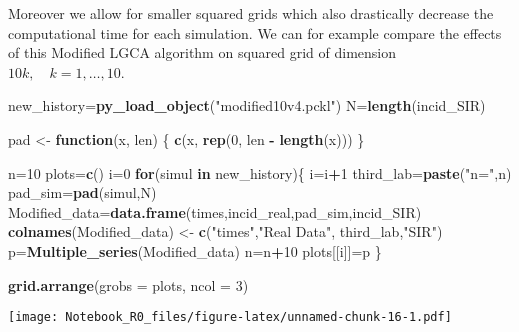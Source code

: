 \documentclass[
]{article}
\newenvironment{Shaded}{\begin{snugshade}}{\end{snugshade}}
\newcommand{\AttributeTok}[1]{\textcolor[rgb]{0.13,0.29,0.53}{#1}}
\newcommand{\ControlFlowTok}[1]{\textcolor[rgb]{0.13,0.29,0.53}{\textbf{#1}}}
\newcommand{\DecValTok}[1]{\textcolor[rgb]{0.00,0.00,0.81}{#1}}
\newcommand{\FunctionTok}[1]{\textcolor[rgb]{0.13,0.29,0.53}{\textbf{#1}}}
\newcommand{\NormalTok}[1]{#1}
\newcommand{\OtherTok}[1]{\textcolor[rgb]{0.56,0.35,0.01}{#1}}
\newcommand{\SpecialCharTok}[1]{\textcolor[rgb]{0.81,0.36,0.00}{\textbf{#1}}}
\newcommand{\StringTok}[1]{\textcolor[rgb]{0.31,0.60,0.02}{#1}}
\begin{document}
Moreover we allow for smaller squared grids which also drastically
decrease the computational time for each simulation. We can for example
compare the effects of this Modified LGCA algorithm on squared grid of
dimension \(10k,\quad k=1,\dots,10\).

\begin{Shaded}
\begin{Highlighting}[]
\NormalTok{new\_history}\OtherTok{=}\FunctionTok{py\_load\_object}\NormalTok{(}\StringTok{"modified10v4.pckl"}\NormalTok{)}
\NormalTok{N}\OtherTok{=}\FunctionTok{length}\NormalTok{(incid\_SIR)}

\NormalTok{pad }\OtherTok{\textless{}{-}} \ControlFlowTok{function}\NormalTok{(x, len) \{}
  \FunctionTok{c}\NormalTok{(x, }\FunctionTok{rep}\NormalTok{(}\DecValTok{0}\NormalTok{, len }\SpecialCharTok{{-}} \FunctionTok{length}\NormalTok{(x)))}
\NormalTok{\}}


\NormalTok{n}\OtherTok{=}\DecValTok{10}
\NormalTok{plots}\OtherTok{=}\FunctionTok{c}\NormalTok{()}
\NormalTok{i}\OtherTok{=}\DecValTok{0}
\ControlFlowTok{for}\NormalTok{(simul }\ControlFlowTok{in}\NormalTok{ new\_history)\{}
\NormalTok{  i}\OtherTok{=}\NormalTok{i}\SpecialCharTok{+}\DecValTok{1}
\NormalTok{  third\_lab}\OtherTok{=}\FunctionTok{paste}\NormalTok{(}\StringTok{"n="}\NormalTok{,n)}
\NormalTok{  pad\_sim}\OtherTok{=}\FunctionTok{pad}\NormalTok{(simul,N)}
\NormalTok{  Modified\_data}\OtherTok{=}\FunctionTok{data.frame}\NormalTok{(times,incid\_real,pad\_sim,incid\_SIR)}
  \FunctionTok{colnames}\NormalTok{(Modified\_data) }\OtherTok{\textless{}{-}} \FunctionTok{c}\NormalTok{(}\StringTok{"times"}\NormalTok{,}\StringTok{"Real Data"}\NormalTok{,  third\_lab,}\StringTok{"SIR"}\NormalTok{)}
\NormalTok{  p}\OtherTok{=}\FunctionTok{Multiple\_series}\NormalTok{(Modified\_data)}
\NormalTok{  n}\OtherTok{=}\NormalTok{n}\SpecialCharTok{+}\DecValTok{10}
\NormalTok{  plots[[i]]}\OtherTok{=}\NormalTok{p}
\NormalTok{\}}



\FunctionTok{grid.arrange}\NormalTok{(}\AttributeTok{grobs =}\NormalTok{ plots, }\AttributeTok{ncol =} \DecValTok{3}\NormalTok{)}
\end{Highlighting}
\end{Shaded}

\texttt{[image: Notebook\_R0\_files/figure-latex/unnamed-chunk-16-1.pdf]}
\end{document}

